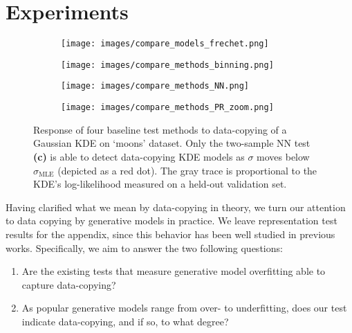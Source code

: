 \section{Experiments}
\label{sec:experiments}
\begin{figure*}
    \centering
    \begin{subfigure}{.24\linewidth}
        \centering
        \texttt{[image: images/compare\_models\_frechet.png]}
        \caption{}\label{fig:moons frechet}
    \end{subfigure}
    \begin{subfigure}{0.24\linewidth}
        \centering
        \texttt{[image: images/compare\_methods\_binning.png]}
        \caption{}\label{fig:moons binning}
    \end{subfigure}
    \begin{subfigure}{.24\linewidth}
        \centering
        \texttt{[image: images/compare\_methods\_NN.png]}
        \caption{}\label{fig:moons NN compare}
    \end{subfigure}
    \begin{subfigure}{0.24\linewidth}
        \centering
        \texttt{[image: images/compare\_methods\_PR\_zoom.png]}
        \caption{}\label{fig:moons PR}
    \end{subfigure}
    \caption[Response of four baseline test methods to data-copying of a Gaussian KDE on `moons' dataset.]{Response of four baseline test methods to data-copying of a Gaussian KDE on `moons' dataset. Only the two-sample NN test \textbf{(c)} is able to detect data-copying KDE models as $\sigma$ moves below $\sigma_{\text{MLE}}$ (depicted as a red dot). The gray trace is proportional to the KDE's log-likelihood measured on a held-out validation set.}
    \label{fig:compare methods}
\end{figure*} 

Having clarified what we mean by data-copying in theory, we turn our attention to data copying by generative models in practice. We leave representation test results for the appendix, since this behavior has been well studied in previous works. Specifically, we aim to answer the two following questions:
\begin{enumerate}
    \item  Are the existing tests that measure generative model overfitting able to capture data-copying? 
    \item As popular generative models range from over- to underfitting, does our test indicate data-copying, and if so, to what degree? 
\end{enumerate}

